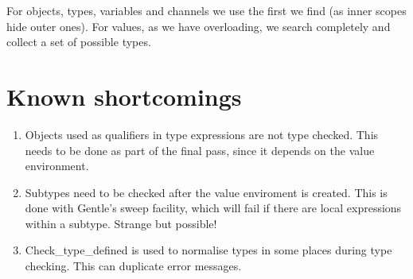 \documentclass[a4paper]{article}
\begin{document}
For objects, types, variables and channels we use the first we find
(as inner scopes hide outer ones).  For values, as we have
overloading, we search completely and collect a set of possible types.

\section{Known shortcomings}
\label{sec:shortcomings}

\begin{enumerate}
  \item Objects used as qualifiers in type expressions are not type
    checked.  This needs to be done as part of the final pass, since
    it depends on the value environment.
  \item Subtypes need to be checked after the value enviroment is
    created.  This is done with Gentle's sweep facility, which will
    fail if there are local expressions within a subtype.  Strange but
    possible!
  \item Check\_type\_defined is used to normalise types in some places
    during type checking.  This can duplicate error messages.

\end{enumerate}
\end{document}
